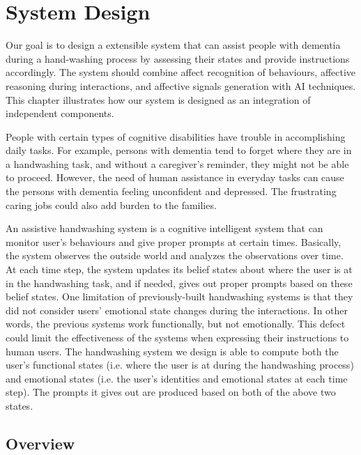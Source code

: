 \chapter{System Design}
\label{chap:design}

Our goal is to design a extensible system that can assist people with dementia during a hand-washing process by assessing their states and provide instructions accordingly. The system should combine affect recognition of behaviours, affective reasoning during interactions, and affective signals generation with AI techniques. This chapter illustrates how our system is designed as an integration of independent components. 

People with certain types of cognitive disabilities have trouble in accomplishing daily tasks. For example, persons with dementia tend to forget where they are in a handwashing task, and without a caregiver's reminder, they might not be able to proceed. However, the need of human assistance in everyday tasks can cause the persons with dementia feeling unconfident and depressed. The frustrating caring jobs could also add burden to the families.

An assistive handwashing system is a cognitive intelligent system that can monitor user's behaviours and give proper prompts at certain times. Basically, the system observes the outside world and analyzes the observations over time. At each time step, the system updates its belief states about where the user is at in the handwashing task, and if needed, gives out proper prompts based on these belief states. One limitation of previously-built handwashing systems is that they did not consider users' emotional state changes during the interactions. In other words, the previous systems work functionally, but not emotionally. This defect could limit the effectiveness of the systems when expressing their instructions to human users. The handwashing system we design is able to compute both the user's functional states (i.e. where the user is at during the handwashing process) and emotional states (i.e. the user's identities and emotional states at each time step). The prompts it gives out are produced based on both of the above two states. 

\section{Overview}

